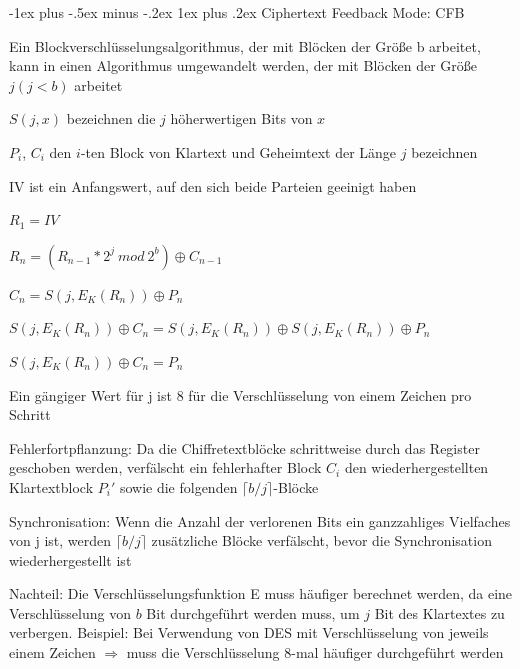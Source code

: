 \documentclass[a4paper]{article}
\makeatletter
\renewcommand{\subsubsection}{\@startsection{subsubsection}{3}{0mm}%
 {-1ex plus -.5ex minus -.2ex}%
 {1ex plus .2ex}%
 {\normalfont\small\bfseries}}
\makeatother
\begin{document}
\begin{multicols}{3}
      \subsubsection{Ciphertext Feedback Mode: CFB}
      \begin{itemize*}
            \item Ein Blockverschlüsselungsalgorithmus, der mit Blöcken der Größe b arbeitet, kann in einen Algorithmus umgewandelt werden, der mit Blöcken der Größe $j (j<b)$ arbeitet
            \begin{itemize*}
                  \item $S(j, x)$ bezeichnen die $j$ höherwertigen Bits von $x$
                  \item $P_i$, $C_i$ den $i$-ten Block von Klartext und Geheimtext der Länge $j$ bezeichnen
                  \item IV ist ein Anfangswert, auf den sich beide Parteien geeinigt haben
                  \item $R_1 = IV$
                  \item $R_n = (R_{n-1}*2^j\ mod\ 2^b)\oplus C_{n-1}$
                  \item $C_n = S(j,E_K(R_n))\oplus P_n$
                  \item $S(j,E_K(R_n))\oplus C_n = S(j,E_K(R_n))\oplus S(j,E_K(R_n))\oplus P_n$
                  \item $S(j,E_K(R_n))\oplus C_n = P_n$
            \end{itemize*}
            \item Ein gängiger Wert für j ist 8 für die Verschlüsselung von einem Zeichen pro Schritt
            \item Fehlerfortpflanzung: Da die Chiffretextblöcke schrittweise durch das Register geschoben werden, verfälscht ein fehlerhafter Block $C_i$ den wiederhergestellten Klartextblock $P_i'$ sowie die folgenden $\lceil b / j\rceil$-Blöcke
            \item Synchronisation: Wenn die Anzahl der verlorenen Bits ein ganzzahliges Vielfaches von j ist, werden $\lceil b / j\rceil$ zusätzliche Blöcke verfälscht, bevor die Synchronisation wiederhergestellt ist%
            \item Nachteil: Die Verschlüsselungsfunktion E muss häufiger berechnet werden, da eine Verschlüsselung von $b$ Bit durchgeführt werden muss, um $j$ Bit des Klartextes zu verbergen. Beispiel: Bei Verwendung von DES mit Verschlüsselung von jeweils einem Zeichen $\Rightarrow$ muss die Verschlüsselung 8-mal häufiger durchgeführt werden
      \end{itemize*}


\end{multicols}
\end{document}

